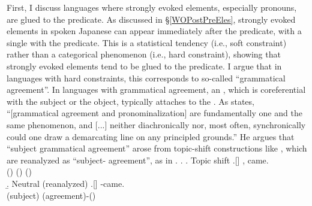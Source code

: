 First, I discuss languages where strongly evoked elements, especially pronouns, are glued to the predicate.
As discussed in \S \ref{WOPostPreEles},
strongly evoked elements in spoken Japanese can appear immediately after the predicate, with a single  with the predicate.
This is a statistical tendency (i.e., soft constraint) rather than a categorical phenomenon (i.e., hard constraint),
showing that strongly evoked elements tend to be glued to the predicate.
I argue that in languages with hard constraints,
this corresponds to so-called ``grammatical agreement''.
In languages with grammatical agreement,
an , which is coreferential with the subject or the object,
typically attaches to the .
As  states,
``[grammatical agreement and pronominalization] are fundamentally one and the same phenomenon, and [...] neither diachronically nor, most often, synchronically could one draw a demarcating line on any principled grounds.''
He argues that ``subject grammatical agreement'' arose from topic-shift constructions like \Next[a],
which are reanalyzed as ``subject- agreement'', as in \Next[b].
%
\ex.\label{Disc:HardConst:Integrated:Ex:TS}
 \a. Topic shift
 \bg.[] ,  came. \\
        () () () \\
 \b. Neutral (reanalyzed)
 \bg.[]  -came. \\
        (subject) (agreement)-() \\
 \hfill{\cite[155]{givon76}}

